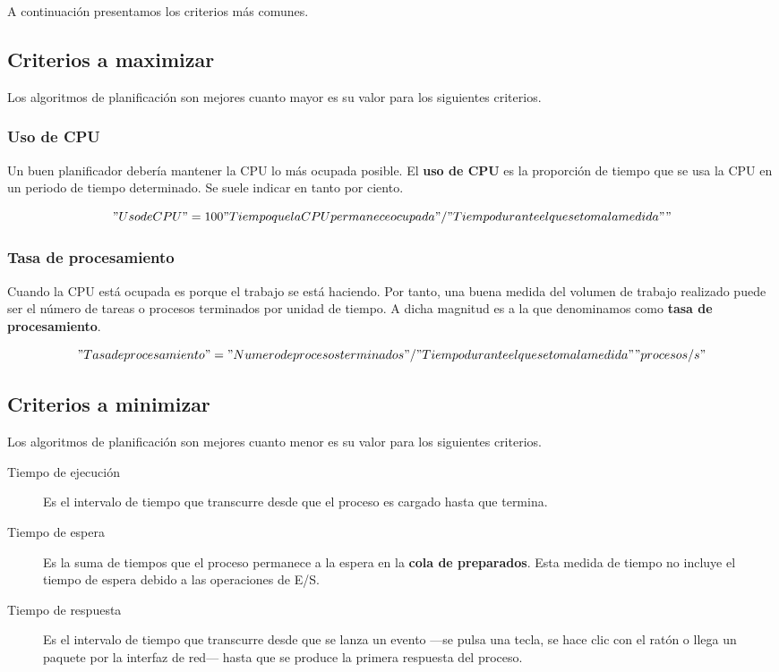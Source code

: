 A continuación presentamos los criterios más comunes.

\subsection{Criterios a maximizar}\label{_criterios_a_maximizar}

Los algoritmos de planificación son mejores cuanto mayor es su valor
para los siguientes criterios.

\subsubsection{Uso de CPU}\label{_uso_de_cpu}

{} Un buen planificador debería mantener la CPU lo más ocupada posible.
El \textbf{uso de CPU} es la proporción de tiempo que se usa la CPU en
un periodo de tiempo determinado. Se suele indicar en tanto por ciento.

\["Uso de CPU" = 100 "Tiempo que la CPU permanece ocupada" / "Tiempo durante el que se toma la medida" "%
\]

\subsubsection{Tasa de procesamiento}\label{_tasa_de_procesamiento}

{} Cuando la CPU está ocupada es porque el trabajo se está haciendo. Por
tanto, una buena medida del volumen de trabajo realizado puede ser el
número de tareas o procesos terminados por unidad de tiempo. A dicha
magnitud es a la que denominamos como \textbf{tasa de procesamiento}.

\["Tasa de procesamiento" = "Numero de procesos terminados" / "Tiempo durante el que se toma la medida" "procesos/s"\]

\subsection{Criterios a minimizar}\label{_criterios_a_minimizar}

Los algoritmos de planificación son mejores cuanto menor es su valor
para los siguientes criterios.

\begin{description}
\item[Tiempo de ejecución{}]
Es el intervalo de tiempo que transcurre desde que el proceso es cargado
hasta que termina.
\item[Tiempo de espera{}]
Es la suma de tiempos que el proceso permanece a la espera en la
\textbf{cola de preparados}. Esta medida de tiempo no incluye el tiempo
de espera debido a las operaciones de E/S.
\item[Tiempo de respuesta{}]
Es el intervalo de tiempo que transcurre desde que se lanza un evento
---se pulsa una tecla, se hace clic con el ratón o llega un paquete por
la interfaz de red--- hasta que se produce la primera respuesta del
proceso.
\end{description}

